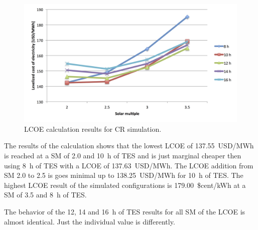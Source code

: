\begin{figure}[htbp]  
\centering
\includegraphics[width=1\linewidth]{FIG/CR_LCOE}
\caption[LCOE calculation results for CR simulation.]{LCOE calculation results for CR simulation.}\label{CR_LCOE}
\end{figure}
The results of the calculation shows that the lowest LCOE of 137.55~USD/MWh is reached at a SM of 2.0 and 10~h of TES and is just  marginal cheaper then using 8~h of TES with a LCOE of 137.63~USD/MWh. The LCOE addition from SM 2.0 to 2.5 is goes minimal up to 138.25~USD/MWh for 10~h of TES. The highest LCOE result of the simulated configurations is 179.00~\$cent/kWh at a SM of 3.5 and 8~h of TES. 

The behavior of the 12, 14 and 16~h of TES results for all SM of the LCOE is almost identical. Just the individual value is differently.

